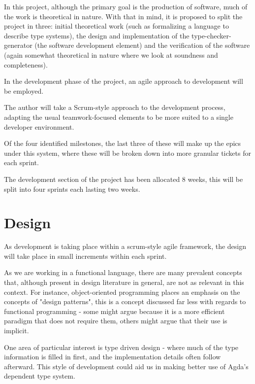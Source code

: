 \documentclass{ProgressReport}[2020/09/15]
\begin{document}
        In this project, although the primary goal is the production
        of software, much of the work is theoretical in nature. With
        that in mind, it is proposed to split the project in three:
        initial theoretical work (such as formalizing a language to
        describe type systems), the design and implementation of the
        type-checker-generator (the software development element) and
        the verification of the software (again somewhat theoretical
        in nature where we look at soundness and completeness).
        
        In the development phase of the project, an agile approach to
        development will be employed. 

        The author will take a Scrum-style approach to the development
        process, adapting the usual teamwork-focused elements to be
        more suited to a single developer environment.

        Of the four identified milestones, the last three of these
        will make up the epics under this system, where these will be
        broken down into more granular tickets for each sprint.

        The development section of the project has been allocated 8
        weeks, this will be split into four sprints each lasting two
        weeks. 
        
        \section{Design}

        As development is taking place within a scrum-style agile framework, the
        design will take place in small increments within each
        sprint.

        As we are working in a functional language, there are many
        prevalent concepts that, although present in design literature
        in general, are not as relevant in this context. For
        instance, object-oriented programming places an emphasis on
        the concepts of "design patterns", this is a concept discussed
        far less with regards to functional programming - some might
        argue because it is a more efficient paradigm that does not
        require them, others might argue that their use is implicit.

        One area of particular interest is type driven
        design - where much of the type information is filled in
        first, and the implementation details often follow
        afterward. This style of development could aid us in making
        better use of Agda's dependent type system.
\end{document}
